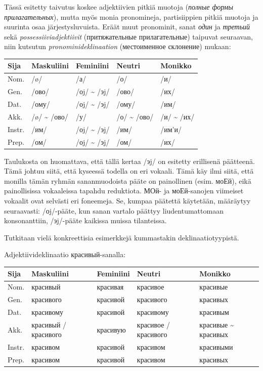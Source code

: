 \documentclass[]{scrreprt}
\begin{document}
Tässä esitetty taivutus koskee adjektiivien pitkiä muotoja (\emph{полные
формы прилагательных}), mutta myös monia pronomineja, partisiippien
pitkiä muotoja ja suurinta osaa järjestysluvuista. Eräät muut
pronominit, sanat \emph{один} ja \emph{третьий} sekä
\emph{possessiiviadjektiivit} (притяжательные прилагательные) taipuvat
seuraavan, niin kutsutun \emph{pronominideklinaation} (местоименное
склонение) mukaan:

\begin{longtable}[c]{@{}lllll@{}}
\toprule
Sija & Maskuliini & Feminiini & Neutri & Monikko\tabularnewline
\midrule
\endhead
Nom. & /ø/ & /а/ & /о/ & /и/\tabularnewline
Gen. & /ово/ & /оj/ \textasciitilde{} /эj/ & /ово/ & /их/\tabularnewline
Dat. & /ому/ & /оj/ \textasciitilde{} /эj/ & /ому/ & /им/\tabularnewline
Akk. & /ø/ \textasciitilde{} /ово/ & /у/ & /о/ \textasciitilde{} /ово/ &
/и/ \textasciitilde{} /их/\tabularnewline
Instr. & /им/ & /оj/ \textasciitilde{} /эj/ & /им/ &
/им'и/\tabularnewline
Prep. & /ом/ & /оj/ \textasciitilde{} /эj/ & /ом/ & /их/\tabularnewline
\bottomrule
\end{longtable}

Taulukosta on huomattava, että tällä kertaa /эj/ on esitetty erillisenä
päätteenä. Tämä johtuu siitä, että kyseessä todella on eri vokaali. Tämä
käy ilmi siitä, että monilla tämän ryhmän sananmuodoista pääte on
painollinen (esim. моЕй), eikä painollisissa vokaaleissa tapahdu
reduktiota. МОй- ja моЕй-sanojen viimeiset vokaalit ovat selvästi eri
foneemeja. Se, kumpaa päätettä käytetään, määräytyy seuraavasti:
/оj/-pääte, kun sanan vartalo päättyy liudentumattomaan konsonanttiin,
/эj/-pääte kaikissa muissa tilanteissa.

Tutkitaan vielä konkreettisia esimerkkejä kummastakin
deklinaatiotyypistä.

Adjektiivideklinaatio красивый-sanalla:

\begin{longtable}[c]{@{}lllll@{}}
\toprule
Sija & Maskuliini & Feminiini & Neutri & Monikko\tabularnewline
\midrule
\endhead
Nom. & красивый & красивая & красивое & красивые\tabularnewline
Gen. & красивого & красивой & красивого & красивых\tabularnewline
Dat. & красивому & красивой & красивому & красивым\tabularnewline
Akk. & красивый / красивого & красивую & красивое / красивого & красивые
\textasciitilde{} красивых\tabularnewline
Instr. & красивом & красивой & красивом & красивыми\tabularnewline
Prep. & красивом & красивой & красивом & красивых\tabularnewline
\bottomrule
\end{longtable}
\end{document}
